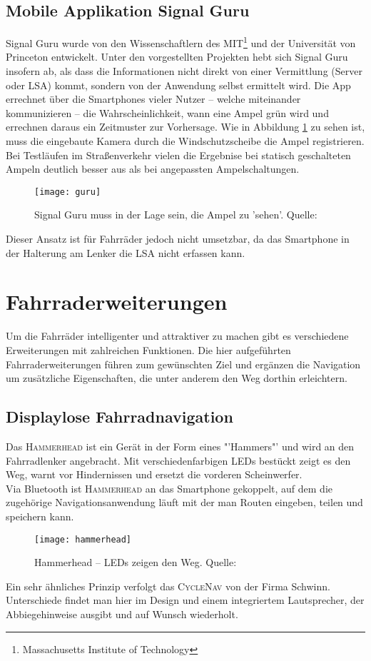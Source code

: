 \subsection*{Mobile Applikation Signal Guru}
Signal Guru wurde von den Wissenschaftlern des MIT\footnote{ Massachusetts Institute of Technology} und der Universität von Princeton entwickelt. Unter den vorgestellten Projekten hebt sich Signal Guru insofern ab, als dass die Informationen nicht direkt von einer Vermittlung (Server oder \gls{LSA}) kommt, sondern von der Anwendung selbst ermittelt wird. Die \Gls{App} errechnet über die \glspl{Smartphone} vieler Nutzer -- welche miteinander kommunizieren -- die Wahrscheinlichkeit, wann eine Ampel grün wird und errechnen daraus ein Zeitmuster zur Vorhersage. Wie in Abbildung \ref{fig:AppSignalGuru} zu sehen ist, muss die eingebaute Kamera durch die Windschutzscheibe die Ampel registrieren. Bei Testläufen im Straßenverkehr vielen die Ergebnise bei statisch geschalteten Ampeln deutlich besser aus als bei angepassten Ampelschaltungen. \cite{SignalGuruPaper}\\ 
\begin{figure}[H]
    \centering
    \texttt{[image: guru]}
    \grayRule
    \caption[Signal Guru]{Signal Guru muss in der Lage sein, die Ampel zu 'sehen'.  Quelle: \cite{SignalGuruPaper}} \label{fig:AppSignalGuru}
\end{figure}
Dieser Ansatz ist für Fahrräder jedoch nicht umsetzbar, da das \gls{Smartphone} in der Halterung am Lenker die \gls{LSA} nicht erfassen kann.
%
%
\clearpage
\section{Fahrraderweiterungen}
Um die Fahrräder intelligenter und attraktiver zu machen gibt es verschiedene Erweiterungen mit zahlreichen Funktionen. Die hier aufgeführten Fahrraderweiterungen führen zum gewünschten Ziel und ergänzen die Navigation um zusätzliche Eigenschaften, die unter anderem den Weg dorthin erleichtern.
\subsection{Displaylose Fahrradnavigation}
Das \textsc{Hammerhead} ist ein Gerät in der Form eines "'Hammers"' und wird an den Fahrradlenker angebracht. Mit verschiedenfarbigen \glspl{LED} bestückt zeigt es den Weg, warnt vor Hindernissen und ersetzt die vorderen Scheinwerfer.\\
Via Bluetooth ist \textsc{Hammerhead} an das \gls{Smartphone} gekoppelt, auf dem die zugehörige Navigationsanwendung läuft mit der man Routen eingeben, teilen und speichern kann. \cite{Hammerhead}\\
\begin{figure}[H]
    \centering
    \texttt{[image: hammerhead]}
    \grayRule
    \caption[Hammerhead]{Hammerhead -- \glspl{LED} zeigen den Weg.  Quelle: \cite{Hammerhead}} 
    \label{fig:hammerhead}
\end{figure}
Ein sehr ähnliches Prinzip verfolgt das \textsc{CycleNav} von der Firma Schwinn. Unterschiede findet man hier im Design und einem integriertem Lautsprecher, der Abbiegehinweise ausgibt und auf Wunsch wiederholt. \cite{CycleNav}
